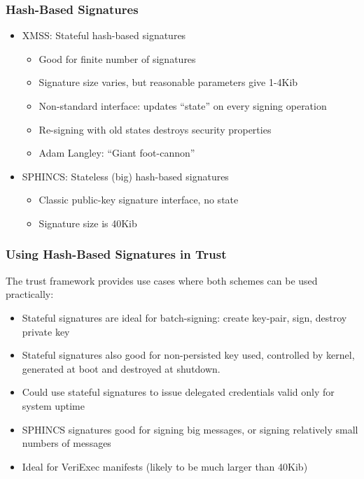 \documentclass{beamer}
\begin{document}
\begin{frame}
  \frametitle{Hash-Based Signatures}
  \begin{itemize}
  \item XMSS: Stateful hash-based signatures
    \begin{itemize}
    \item Good for finite number of signatures
    \item Signature size varies, but reasonable parameters give 1-4Kib
    \item Non-standard interface: updates ``state'' on every signing
      operation
    \item Re-signing with old states destroys security properties
    \item Adam Langley: ``Giant foot-cannon''
    \end{itemize}
  \item SPHINCS: Stateless (big) hash-based signatures
    \begin{itemize}
    \item Classic public-key signature interface, no state
    \item Signature size is 40Kib
    \end{itemize}
  \end{itemize}
\end{frame}

\begin{frame}
  \frametitle{Using Hash-Based Signatures in Trust}

  The trust framework provides use cases where both schemes can be
  used practically:
  \begin{itemize}
    \item Stateful signatures are ideal for batch-signing: create
      key-pair, sign, destroy private key
    \item Stateful signatures also good for non-persisted key used,
      controlled by kernel, generated at boot and destroyed at
      shutdown.
    \item Could use stateful signatures to issue delegated
      credentials valid only for system uptime
    \item SPHINCS signatures good for signing big messages, or signing
      relatively small numbers of messages
    \item Ideal for VeriExec manifests (likely to be much larger than
      40Kib)
  \end{itemize}
\end{frame}
\end{document}
